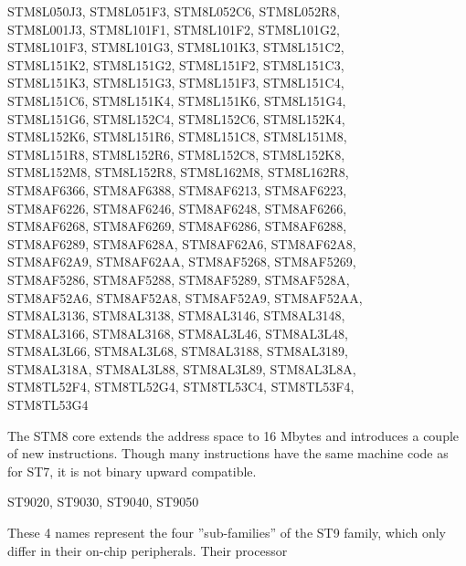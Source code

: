 \documentclass[12pt,twoside]{report}
\begin{document}
\begin{cpulist}
\> STM8L050J3, STM8L051F3, STM8L052C6, STM8L052R8,\\
\> STM8L001J3, STM8L101F1, STM8L101F2, STM8L101G2,\\
\> STM8L101F3, STM8L101G3, STM8L101K3, STM8L151C2,\\
\> STM8L151K2, STM8L151G2, STM8L151F2, STM8L151C3,\\
\> STM8L151K3, STM8L151G3, STM8L151F3, STM8L151C4,\\
\> STM8L151C6, STM8L151K4, STM8L151K6, STM8L151G4,\\
\> STM8L151G6, STM8L152C4, STM8L152C6, STM8L152K4,\\
\> STM8L152K6, STM8L151R6, STM8L151C8, STM8L151M8,\\
\> STM8L151R8, STM8L152R6, STM8L152C8, STM8L152K8,\\
\> STM8L152M8, STM8L152R8, STM8L162M8, STM8L162R8,\\
\> STM8AF6366, STM8AF6388, STM8AF6213, STM8AF6223,\\
\> STM8AF6226, STM8AF6246, STM8AF6248, STM8AF6266,\\
\> STM8AF6268, STM8AF6269, STM8AF6286, STM8AF6288,\\
\> STM8AF6289, STM8AF628A, STM8AF62A6, STM8AF62A8,\\
\> STM8AF62A9, STM8AF62AA, STM8AF5268, STM8AF5269,\\
\> STM8AF5286, STM8AF5288, STM8AF5289, STM8AF528A,\\
\> STM8AF52A6, STM8AF52A8, STM8AF52A9, STM8AF52AA,\\
\> STM8AL3136, STM8AL3138, STM8AL3146, STM8AL3148,\\
\> STM8AL3166, STM8AL3168, STM8AL3L46, STM8AL3L48,\\
\> STM8AL3L66, STM8AL3L68, STM8AL3188, STM8AL3189,\\
\> STM8AL318A, STM8AL3L88, STM8AL3L89, STM8AL3L8A,\\
\> STM8TL52F4, STM8TL52G4, STM8TL53C4, STM8TL53F4,\\
\> STM8TL53G4
\end{cpulist}
The STM8 core extends the address space to 16 Mbytes and introduces
a couple of new instructions.  Though many instructions have the same
machine code as for ST7, it is not binary upward compatible.
\begin{cpulist}
   ST9020, ST9030, ST9040, ST9050
\end{cpulist}
These 4 names represent the four ''sub-families'' of the ST9 family,
which only differ in their on-chip peripherals.  Their processor
\end{document}
